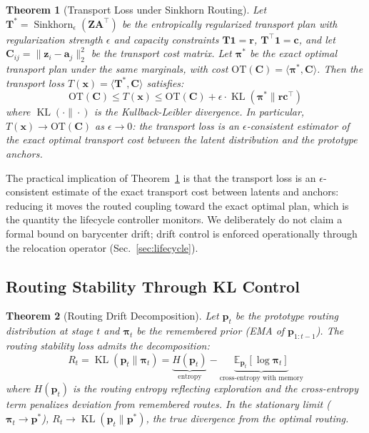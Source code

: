 \documentclass[11pt,a4paper]{article}
\newtheorem{theorem}{Theorem}[section]
\theoremstyle{definition}
\DeclareMathOperator{\Sinkhorn}{Sinkhorn}
\DeclareMathOperator{\KL}{KL}
\begin{document}
\begin{theorem}[Transport Loss under Sinkhorn Routing]
\label{thm:transport}
Let $\mathbf{T}^* = \Sinkhorn_{\epsilon}(\mathbf{Z}\mathbf{A}^\top)$ be the entropically regularized transport plan with regularization strength $\epsilon$ and capacity constraints $\mathbf{T}\mathbf{1} = \mathbf{r}$, $\mathbf{T}^\top\mathbf{1} = \mathbf{c}$, and let $\mathbf{C}_{ij} = \|\mathbf{z}_i - \mathbf{a}_j\|_2^2$ be the transport cost matrix. Let $\boldsymbol{\pi}^*$ be the exact optimal transport plan under the same marginals, with cost $\mathrm{OT}(\mathbf{C}) = \langle \boldsymbol{\pi}^*, \mathbf{C} \rangle$. Then the transport loss $T(\mathbf{x}) = \langle \mathbf{T}^*, \mathbf{C} \rangle$ satisfies:
\begin{equation}
\mathrm{OT}(\mathbf{C}) \leq T(\mathbf{x}) \leq \mathrm{OT}(\mathbf{C}) + \epsilon \cdot \KL(\boldsymbol{\pi}^* \| \mathbf{r}\mathbf{c}^\top)
\end{equation}
where $\KL(\cdot\|\cdot)$ is the Kullback-Leibler divergence. In particular, $T(\mathbf{x}) \to \mathrm{OT}(\mathbf{C})$ as $\epsilon \to 0$: the transport loss is an $\epsilon$-consistent estimator of the exact optimal transport cost between the latent distribution and the prototype anchors.
\end{theorem}

The practical implication of Theorem~\ref{thm:transport} is that the transport loss is an $\epsilon$-consistent estimate of the exact transport cost between latents and anchors: reducing it moves the routed coupling toward the exact optimal plan, which is the quantity the lifecycle controller monitors. We deliberately do not claim a formal bound on barycenter drift; drift control is enforced operationally through the relocation operator (Sec.~\ref{sec:lifecycle}).

\subsection{Routing Stability Through KL Control}

\begin{theorem}[Routing Drift Decomposition]
\label{thm:routing}
Let $\mathbf{p}_t$ be the prototype routing distribution at stage $t$ and $\boldsymbol{\pi}_t$ be the remembered prior (EMA of $\mathbf{p}_{1:t-1}$). The routing stability loss admits the decomposition:
\begin{equation}
R_t = \KL(\mathbf{p}_t \| \boldsymbol{\pi}_t) = \underbrace{H(\mathbf{p}_t)}_{\text{entropy}} - \underbrace{\mathbb{E}_{\mathbf{p}_t}[\log \boldsymbol{\pi}_t]}_{\text{cross-entropy with memory}}
\end{equation}
where $H(\mathbf{p}_t)$ is the routing entropy reflecting exploration and the cross-entropy term penalizes deviation from remembered routes. In the stationary limit ($\boldsymbol{\pi}_t \to \mathbf{p}^*$), $R_t \to \KL(\mathbf{p}_t \| \mathbf{p}^*)$, the true divergence from the optimal routing.
\end{theorem}
\end{document}
